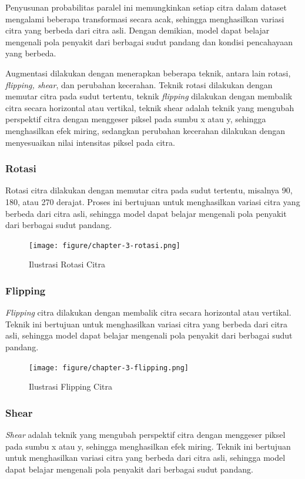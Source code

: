 Penyusunan probabilitas paralel ini memungkinkan setiap citra dalam dataset mengalami beberapa transformasi secara acak, sehingga menghasilkan variasi citra yang berbeda dari citra asli. Dengan demikian, model dapat belajar mengenali pola penyakit dari berbagai sudut pandang dan kondisi pencahayaan yang berbeda.

Augmentasi dilakukan dengan menerapkan beberapa teknik, antara lain rotasi, \textit{flipping, shear}, dan perubahan kecerahan. Teknik rotasi dilakukan dengan memutar citra pada sudut tertentu, teknik \textit{flipping} dilakukan dengan membalik citra secara horizontal atau vertikal, teknik shear adalah teknik yang mengubah perspektif citra dengan menggeser piksel pada sumbu x atau y, sehingga menghasilkan efek miring, sedangkan perubahan kecerahan dilakukan dengan menyesuaikan nilai intensitas piksel pada citra.

\subsubsection{Rotasi} \label{III.Rotasi}
Rotasi citra dilakukan dengan memutar citra pada sudut tertentu, misalnya 90, 180, atau 270 derajat. Proses ini bertujuan untuk menghasilkan variasi citra yang berbeda dari citra asli, sehingga model dapat belajar mengenali pola penyakit dari berbagai sudut pandang.
\begin{figure}[H]
	\centering
	\texttt{[image: figure/chapter-3-rotasi.png]}
	\caption{Ilustrasi Rotasi Citra}
	\label{fig:3.Rotasi}
\end{figure}

\subsubsection{Flipping} \label{III.Flipping}
\textit{Flipping} citra dilakukan dengan membalik citra secara horizontal atau vertikal. Teknik ini bertujuan untuk menghasilkan variasi citra yang berbeda dari citra asli, sehingga model dapat belajar mengenali pola penyakit dari berbagai sudut pandang.
\begin{figure}[H]
	\centering
	\texttt{[image: figure/chapter-3-flipping.png]}
	\caption{Ilustrasi Flipping Citra}
	\label{fig:3.Flipping}
\end{figure}

\subsubsection{Shear} \label{III.Shear}
\textit{Shear} adalah teknik yang mengubah perspektif citra dengan menggeser piksel pada sumbu x atau y, sehingga menghasilkan efek miring. Teknik ini bertujuan untuk menghasilkan variasi citra yang berbeda dari citra asli, sehingga model dapat belajar mengenali pola penyakit dari berbagai sudut pandang.

